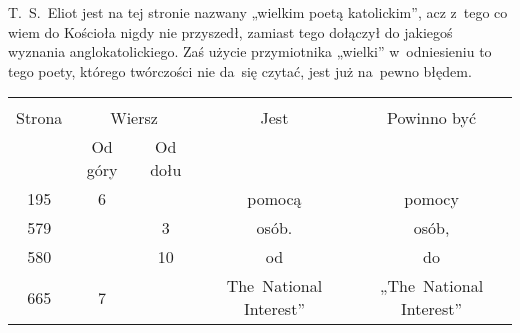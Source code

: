 \documentclass[a4paper,11pt]{article}
\begin{document}
\vspace{\spaceTwo}















\start {} T.~S.~Eliot jest na tej stronie nazwany „wielkim
poetą katolickim”, acz z~tego co wiem do Kościoła nigdy nie
przyszedł, zamiast tego dołączył do jakiegoś wyznania
anglokatolickiego. Zaś użycie przymiotnika „wielki” w~odniesieniu to
tego poety, którego twórczości nie da~się czytać, jest już na~pewno
błędem.


\vspace{\spaceTwo}














\begin{center}

  \begin{tabular}{|c|c|c|c|c|}
    \hline
    & \multicolumn{2}{c|}{} & & \\
    Strona & \multicolumn{2}{c|}{Wiersz} & Jest
                              & Powinno być \\ \cline{2-3}
    & Od góry & Od dołu & & \\
    \hline
    195 &  6 & & pomocą & pomocy \\
    579 & &  3 & osób. & osób, \\
    580 & & 10 & od & do \\
    665 &  7 & & The~National Interest” & „The~National Interest” \\
    \hline
  \end{tabular}

\end{center}
\end{document}
